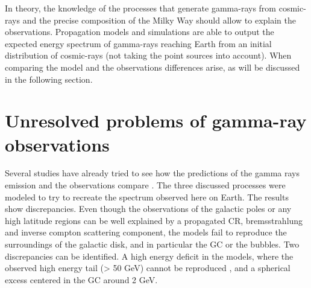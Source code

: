 

In theory, the knowledge of the processes that generate gamma-rays from cosmic-rays and the precise composition of the Milky Way should allow to explain the observations. Propagation models and simulations are able to output the expected energy spectrum of gamma-rays reaching Earth from an initial distribution of cosmic-rays (not taking the point sources into account). When comparing the model and the observations differences arise, as will be discussed in the following section.


\newpage
\section{Unresolved problems of gamma-ray observations}
%	
%


%
%
%

Several studies have already tried to see how the predictions of the gamma rays emission and the observations compare . The three discussed processes were modeled to try to recreate the spectrum observed here on Earth. The results show discrepancies.
Even though the observations of the galactic poles or any high latitude regions can be well explained by a propagated CR, bremsstrahlung and inverse compton scattering component, the models fail to reproduce the surroundings of the galactic disk, and in particular the GC or the bubbles. 
Two discrepancies can be identified. A high energy deficit in the models, where the observed high energy tail (> 50 GeV) cannot be reproduced , and a spherical excess centered in the GC around 2 GeV.

